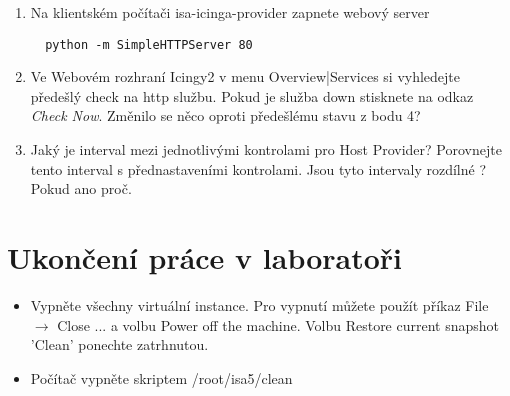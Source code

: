 \begin{itemize}
\begin{enumerate}
          \item Na klientském počítači isa-icinga-provider zapnete webový server
\begin{verbatim}
  python -m SimpleHTTPServer 80
\end{verbatim}
          \item Ve Webovém rozhraní Icingy2 v menu Overview|Services si vyhledejte předešlý check na http službu. Pokud je služba down stisknete na odkaz \textit{Check Now}. Změnilo se něco oproti předešlému stavu z bodu 4?

          \item Jaký je interval mezi jednotlivými kontrolami pro Host Provider? Porovnejte tento interval s přednastaveními kontrolami. Jsou tyto intervaly rozdílné ? Pokud ano proč.

\end{enumerate}
\end{itemize}

\section*{Ukončení práce v laboratoři}
\begin{itemize}
  \item Vypněte všechny virtuální instance. Pro vypnutí můžete použít příkaz File $\rightarrow$ Close ... a volbu Power off the machine. Volbu Restore current snapshot 'Clean' ponechte zatrhnutou.
  \item Počítač vypněte skriptem /root/isa5/clean

\end{itemize}
